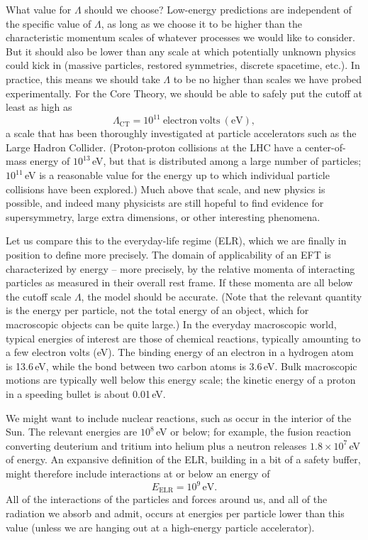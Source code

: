 \documentclass[12pt,letterpaper]{article}
\newcommand{\be}{\begin{equation}}
\newcommand{\ee}{\end{equation}}
\begin{document}
What value for $\Lambda$ should we choose?
Low-energy predictions are independent of the specific value of $\Lambda$, as long as we choose it to be higher than the characteristic momentum scales of whatever processes we would like to consider.
But it should also be lower than any scale at which potentially unknown physics could kick in (massive particles, restored symmetries, discrete spacetime, etc.).
In practice, this means we should take $\Lambda$ to be no higher than scales we have probed experimentally.
For the Core Theory, we should be able to safely put the cutoff at least as high as 
\be
  \Lambda_\mathrm{CT} = 10^{11}~\mathrm{electron~volts~(eV)},
  \label{LambdaCT}
\ee 
a scale that has been thoroughly investigated at particle accelerators such as the Large Hadron Collider.
(Proton-proton collisions at the LHC have a center-of-mass energy of $10^{13}$\,eV, but that is distributed among a large number of particles; $10^{11}$\,eV is a reasonable value for the energy up to which individual particle collisions have been explored.)
Much above that scale, and new physics is possible, and indeed many physicists are still hopeful to find evidence for supersymmetry, large extra dimensions, or other interesting phenomena.

Let us compare this to the everyday-life regime (ELR), which we are finally in position to define more precisely.
The domain of applicability of an EFT is characterized by energy -- more precisely, by the relative momenta of interacting particles as measured in their overall rest frame.
If these momenta are all below the cutoff scale $\Lambda$, the model should be accurate.
(Note that the relevant quantity is the energy per particle, not the total energy of an object, which for macroscopic objects can be quite large.)
In the everyday macroscopic world, typical energies of interest are those of chemical reactions, typically amounting to a few electron volts (eV).
The binding energy of an electron in a hydrogen atom is 13.6\,eV, while the bond between two carbon atoms is 3.6\,eV.
Bulk macroscopic motions are typically well below this energy scale; the kinetic energy of a proton in a speeding bullet is about 0.01\,eV. 

We might want to include nuclear reactions, such as occur in the interior of the Sun. 
The relevant energies are $10^{8}$\,eV or below; for example, the fusion reaction converting deuterium and tritium into helium plus a neutron releases $1.8\times 10^{7}$\,eV of energy.
An expansive definition of the ELR, building in a bit of a safety buffer, might therefore include interactions at or below an energy of 
\be
  E_\mathrm{ELR} = 10^9\,\mathrm{eV}.
  \label{ELR} 
\ee
All of the interactions of the particles and forces around us, and all of the radiation we absorb and admit, occurs at energies per particle lower than this value (unless we are hanging out at a high-energy particle accelerator).
\end{document}
